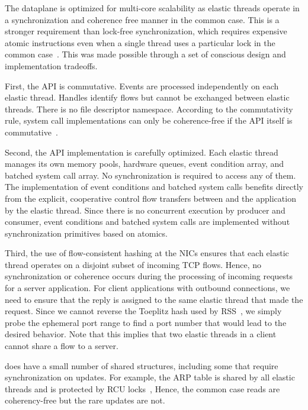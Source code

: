 The \ix dataplane is optimized for multi-core scalability as elastic
threads operate in a synchronization and coherence free manner in the
common case. This is a stronger requirement than lock-free
synchronization, which requires expensive atomic instructions even
when a single thread uses a particular lock in the common
case~\cite{DBLP:conf/sosp/DavidGT13}.  This was made possible 
through a set of conscious design and implementation tradeoffs. 

First, the \ix API is commutative. Events are processed independently
on each elastic thread. Handles identify flows but cannot be exchanged
between elastic threads. There is no file descriptor namespace.
According to the commutativity rule, system call implementations can
only be coherence-free if the API itself is
commutative~\cite{DBLP:conf/sosp/ClementsKZMK13}.

Second, the API implementation is carefully optimized.  Each elastic
thread manages its own memory pools, hardware queues, event condition
array, and batched system call array. No synchronization is required
to access any of them. The implementation of event conditions and
batched system calls benefits directly from the explicit, cooperative
control flow transfers between \ix and the application by the elastic
thread.  Since there is no concurrent execution by producer and
consumer, event conditions and batched system calls are implemented
without synchronization primitives based on
atomics.

Third, the use of flow-consistent hashing at the NICs ensures that
each elastic thread operates on a disjoint subset of incoming TCP
flows. Hence, no synchronization or coherence occurs during the
processing of incoming requests for a server application. For client
applications with outbound connections, we need to ensure that the
reply is assigned to the same elastic thread that made the
request. Since we cannot reverse the Toeplitz hash used by RSS~\cite{url:rss}, we
simply probe the ephemeral port range to find a port number that
would lead to the desired behavior. Note that this implies that two
elastic threads in a client cannot share a flow to a server.


\ix does have a small number of shared structures, including some that
require synchronization on updates.  For example, the ARP table is
shared by all elastic threads and is protected by RCU
locks~\cite{mckenney1998read}, Hence, the common case reads are
coherency-free but the rare updates are not.
%


